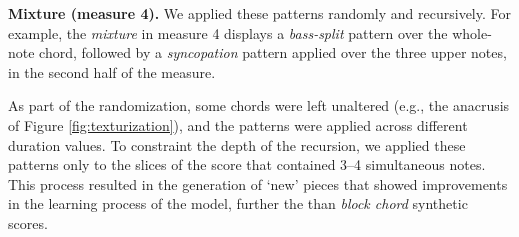 \textbf{Mixture (measure 4).} We applied these patterns randomly and recursively. For example, the \emph{mixture} in measure 4 displays a \emph{bass-split} pattern over the whole-note chord, followed by a \emph{syncopation} pattern applied over the three upper notes, in the second half of the measure.

As part of the randomization, some chords were left unaltered (e.g., the anacrusis of Figure \ref{fig:texturization}), and the patterns were applied across different duration values.
To constraint the depth of the recursion, we applied these patterns only to the slices of the score that contained 3--4 simultaneous notes.
This process resulted in the generation of `new' pieces that showed improvements in the learning process of the model, further the than \emph{block chord} synthetic scores.
